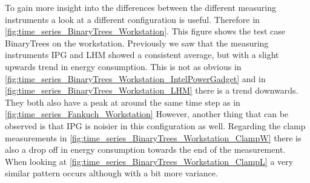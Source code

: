 

To gain more insight into the differences between the different measuring instruments a look at a different configuration is useful. Therefore in \cref{fig:time_series_BinaryTrees_Workstation}. This figure shows the test case BinaryTrees on the workstation. Previously we saw that the measuring instruments IPG and LHM showed a consistent average, but with a slight upwards trend in energy consumption. This is not as obvious in \cref{fig:time_series_BinaryTrees_Workstation_IntelPowerGadget} and in \cref{fig:time_series_BinaryTrees_Workstation_LHM} there is a trend downwards. They both also have a peak at around the same time step as in \cref{fig:time_series_Fankuch_Workstation}
However, another thing that can be observed is that IPG is noisier in this configuration as well.  Regarding the clamp measurements in \cref{fig:time_series_BinaryTrees_Workstation_ClampW} there is also a drop off in energy consumption towards the end of the measurement. When looking at \cref{fig:time_series_BinaryTrees_Workstation_ClampL} a very similar pattern occurs although with a bit more variance. 












